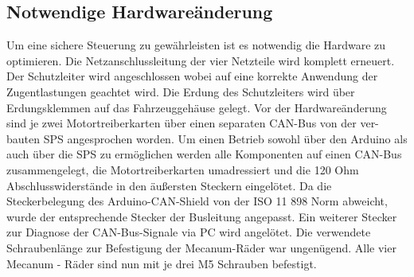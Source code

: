 \subsection{Notwendige Hardwareänderung}
Um eine sichere Steuerung zu gewährleisten ist es notwendig die Hardware zu optimieren.
Die Netzanschlussleitung der vier Netzteile wird komplett erneuert. Der Schutzleiter wird angeschlossen wobei auf eine korrekte Anwendung der Zugentlastungen geachtet wird. Die Erdung des Schutzleiters wird über Erdungsklemmen auf das Fahrzeuggehäuse gelegt.
Vor der Hardwareänderung sind je zwei Motortreiberkarten über einen separaten CAN-Bus von der ver-bauten SPS angesprochen worden. Um einen Betrieb sowohl über den Arduino als auch über die SPS zu ermöglichen werden alle Komponenten auf einen CAN-Bus zusammengelegt, die Motortreiberkarten umadressiert und die 120 Ohm Abschlusswiderstände in den äußersten Steckern eingelötet.
Da die Steckerbelegung des Arduino-CAN-Shield von der ISO 11 898 Norm abweicht, wurde der entsprechende Stecker der Busleitung angepasst. Ein weiterer Stecker zur Diagnose der CAN-Bus-Signale via PC wird angelötet.
Die verwendete Schraubenlänge zur Befestigung der Mecanum-Räder war ungenügend. Alle vier Mecanum - Räder sind nun mit je drei M5 Schrauben befestigt.
